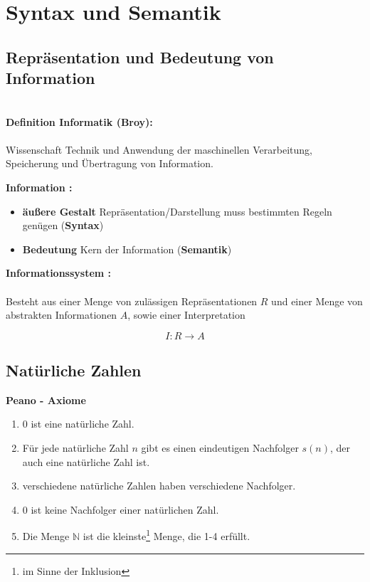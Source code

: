

\newcommand{\myTitle}{Mitschrieb - Informatik A}
\newcommand{\myAuthor}{Dominik Wille & Sarah Zewge}
\newcommand{\myDate}{Wintersemester 2013/2014}
\newcommand{\myTitleImage}{} %
\newcommand{\myTitleLeft}{%
   Freie Universität Berlin\\
   Fachbereich für Informatik\\
   Informatik A%
}
\newcommand{\myTitleRight}{%
  Dozent: \\
  Klaus Kriegel
}


\myTitlepage
\section{Syntax und Semantik}
\subsection{Repräsentation und Bedeutung von Information} \\
\textbf{Definition Informatik (Broy):}\\
\\
 Wissenschaft Technik und Anwendung der maschinellen Verarbeitung, Speicherung und Übertragung von Information.

\textbf{Information :}
\begin{itemize}
\item \textbf{äußere Gestalt} Repräsentation/Darstellung muss bestimmten Regeln genügen (\textbf{Syntax})
\item \textbf{Bedeutung} Kern der Information (\textbf{Semantik})
\end{itemize}

\textbf{Informationssystem :}\\
\\
Besteht aus einer Menge von zulässigen Repräsentationen $R$ und einer Menge von abstrakten Informationen $A$, sowie einer Interpretation

\begin{equation}
I: R \rightarrow A
\end{equation}

\subsection{Natürliche Zahlen}
\textbf{Peano - Axiome}
\begin{enumerate}
\item $0$ ist eine natürliche Zahl.
\item Für jede natürliche Zahl $n$ gibt es einen eindeutigen Nachfolger $s(n)$, der auch eine natürliche Zahl ist.
\item verschiedene natürliche Zahlen haben verschiedene Nachfolger.
\item $0$ ist keine Nachfolger einer natürlichen Zahl.
\item Die Menge $\mathbb{N}$ ist die kleinste\footnote{im Sinne der Inklusion} Menge, die 1-4 erfüllt.
\end{enumerate}

